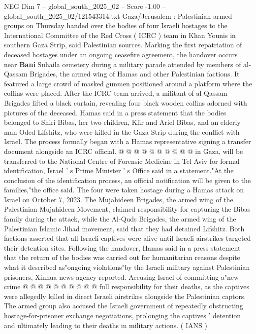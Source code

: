 \begin{textsample}{NEG Dim 7 – global\_south\_2025\_02 – Score -1.00 – global\_south\_2025\_02/121543314.txt}  \label{ex:f7_neg_039}
Gaza/Jerusalem : Palestinian armed groups on Thursday handed over the bodies of four Israeli hostages to the International Committee of the Red Cross ( ICRC ) team in Khan Younis in southern Gaza Strip, said Palestinian sources.
Marking the first repatriation of deceased hostages under an ongoing ceasefire agreement, the handover occurs near \textbf{Bani} Suhaila cemetery during a military parade attended by members of al-Qassam Brigades, the armed wing of Hamas and other Palestinian factions.
It featured a large crowd of masked gunmen positioned around a platform where the coffins were placed.
After the ICRC team arrived, a militant of al-Qassam Brigades lifted a black curtain, revealing four black wooden coffins adorned with pictures of the deceased.
Hamas said in a press statement that the bodies belonged to Shiri Bibas, her two children, Kfir and Ariel Bibas, and an elderly man Oded Lifshitz, who were killed in the Gaza Strip during the conflict with Israel.
The process formally began with a Hamas representative signing a transfer document alongside an ICRC official. @ @ @ @ @ @ @ @ @ @ in Gaza, will be transferred to the National Centre of Forensic Medicine in Tel Aviv for formal identification, Israel ' s Prime Minister ' s Office said in a statement."At the conclusion of the identification process, an official notification will be given to the families,"the office said.
The four were taken hostage during a Hamas attack on Israel on October 7, 2023.
The Mujahideen Brigades, the armed wing of the Palestinian Mujahideen Movement, claimed responsibility for capturing the Bibas family during the attack, while the Al-Quds Brigades, the armed wing of the Palestinian Islamic Jihad movement, said that they had detained Lifshitz.
Both factions asserted that all Israeli captives were alive until Israeli airstrikes targeted their detention sites.
Following the handover, Hamas said in a press statement that the return of the bodies was carried out for humanitarian reasons despite what it described as"ongoing violations"by the Israeli military against Palestinian prisoners, Xinhua news agency reported.
Accusing Israel of committing a"new crime @ @ @ @ @ @ @ @ @ @ full responsibility for their deaths, as the captives were allegedly killed in direct Israeli airstrikes alongside the Palestinian captors.
The armed group also accused the Israeli government of repeatedly obstructing hostage-for-prisoner exchange negotiations, prolonging the captives ' detention and ultimately leading to their deaths in military actions. ( IANS )

\end{textsample}
